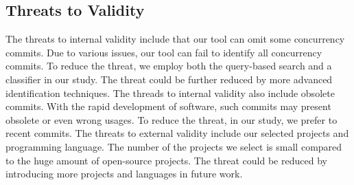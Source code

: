 




\subsection{Threats to Validity}

The threats to internal validity include that our tool can omit some concurrency commits. Due to various issues, our tool can fail to identify all concurrency commits. To reduce the threat, we employ both the query-based search and a classifier in our study. The threat could be further reduced by more advanced identification techniques. The threads to internal validity also include obsolete commits. With the rapid development of software, such commits may present obsolete or even wrong usages. To reduce the threat, in our study, we prefer to recent commits. The threats to external validity include our selected projects and programming language. The number of the projects we select is small compared to the huge amount of open-source projects. The threat could be reduced by introducing more projects and languages in future work.

